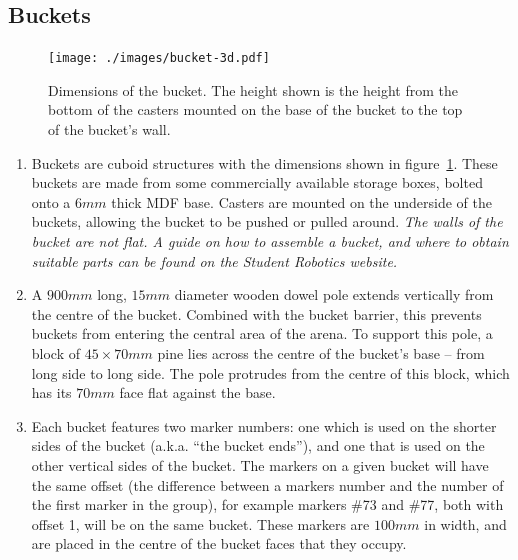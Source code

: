 \subsection{Buckets}
\label{sub:buckets}
\begin{figure}
  \centering
  \texttt{[image: ./images/bucket-3d.pdf]}
  \caption{Dimensions of the bucket.
 The height shown is the height from the bottom of the casters mounted on the base of the bucket to the top of the bucket's wall.}
  \label{fig:bucket-3d}
\end{figure}

\begin{enumerate}
\item Buckets are cuboid structures with the dimensions shown in figure~\ref{fig:bucket-3d}.
      These buckets are made from some commercially available storage boxes, bolted onto a $6mm$ thick MDF base.
      Casters are mounted on the underside of the buckets, allowing the bucket to be pushed or pulled around.
      \textit{The walls of the bucket are not flat.
      A guide on how to assemble a bucket, and where to obtain suitable parts can be found on the Student Robotics website.}

\item A $900mm$ long, $15mm$ diameter wooden dowel pole extends vertically from the centre of the bucket.
      Combined with the bucket barrier, this prevents buckets from entering the central area of the arena.
      To support this pole, a block of $45 \times 70mm$ pine lies across the centre of the bucket's base -- from long side to long side.
      The pole protrudes from the centre of this block, which has its $70mm$ face flat against the base.

\item Each bucket features two marker numbers: one which is used on the shorter sides of the bucket (a.k.a. ``the bucket ends''),
       and one that is used on the other vertical sides of the bucket.
      The markers on a given bucket will have the same offset (the difference between a markers number and the number of the first marker in the group),
       for example markers \#73 and \#77, both with offset 1, will be on the same bucket.
      These markers are $100mm$ in width, and are placed in the centre of the bucket faces that they occupy.

\end{enumerate}

\clearpage
